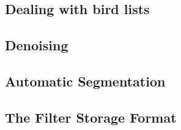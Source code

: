 \documentclass{article}
\begin{document}
\subsection{Dealing with bird lists}\label{sec:birdlists}
%
%
\subsection{Denoising}\label{sec:denoising}

\subsection{Automatic Segmentation}\label{sec:segmentation}

\subsection{The Filter Storage Format}

\end{document}
